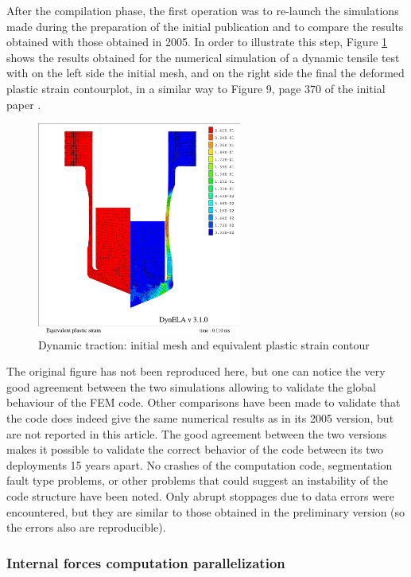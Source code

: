 \documentclass{article}
\begin{document}
After the compilation phase, the first operation was to re-launch the simulations made during the preparation of the initial publication and to compare the results obtained with those obtained in 2005. In order to illustrate this step, Figure \ref{strain} shows the results obtained for the numerical simulation of a dynamic tensile test with on the left side the initial mesh, and on the right side the final the deformed plastic strain contourplot, in a similar way to Figure 9, page 370 of the initial paper \cite{Pantale:2005}. 
\begin{figure}[h!] 
  \centering
  \includegraphics[width=0.6\textwidth]{./strain.pdf}
  \caption{Dynamic traction: initial mesh and equivalent plastic strain contour}
  \label{strain}
\end{figure}
The original figure has not been reproduced here, but one can notice the very good agreement between the two simulations allowing to validate the global behaviour of the FEM code. Other comparisons have been made to validate that the code does indeed give the same numerical results as in its 2005 version, but are not reported in this article. The good agreement between the two versions makes it possible to validate the correct behavior of the code between its two deployments 15 years apart. No crashes of the computation code, segmentation fault type problems, or other problems that could suggest an instability of the code structure have been noted. Only abrupt stoppages due to data errors were encountered, but they are similar to those obtained in the preliminary version (so the errors also are reproducible).

\subsubsection{Internal forces computation parallelization}
\end{document}
